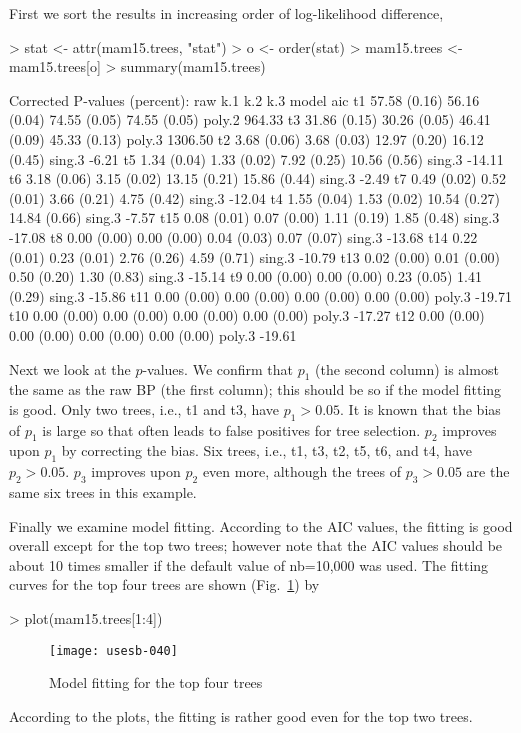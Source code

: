 \documentclass[a4paper]{amsart}
\begin{document}
First we sort the results in increasing order of log-likelihood difference,
\begin{Schunk}
\begin{Sinput}
> stat <- attr(mam15.trees, "stat")
> o <- order(stat)
> mam15.trees <- mam15.trees[o]
> summary(mam15.trees)
\end{Sinput}
\begin{Soutput}
Corrected P-values (percent):
    raw          k.1          k.2          k.3          model  aic     
t1  57.58 (0.16) 56.16 (0.04) 74.55 (0.05) 74.55 (0.05) poly.2  964.33 
t3  31.86 (0.15) 30.26 (0.05) 46.41 (0.09) 45.33 (0.13) poly.3 1306.50 
t2   3.68 (0.06)  3.68 (0.03) 12.97 (0.20) 16.12 (0.45) sing.3   -6.21 
t5   1.34 (0.04)  1.33 (0.02)  7.92 (0.25) 10.56 (0.56) sing.3  -14.11 
t6   3.18 (0.06)  3.15 (0.02) 13.15 (0.21) 15.86 (0.44) sing.3   -2.49 
t7   0.49 (0.02)  0.52 (0.01)  3.66 (0.21)  4.75 (0.42) sing.3  -12.04 
t4   1.55 (0.04)  1.53 (0.02) 10.54 (0.27) 14.84 (0.66) sing.3   -7.57 
t15  0.08 (0.01)  0.07 (0.00)  1.11 (0.19)  1.85 (0.48) sing.3  -17.08 
t8   0.00 (0.00)  0.00 (0.00)  0.04 (0.03)  0.07 (0.07) sing.3  -13.68 
t14  0.22 (0.01)  0.23 (0.01)  2.76 (0.26)  4.59 (0.71) sing.3  -10.79 
t13  0.02 (0.00)  0.01 (0.00)  0.50 (0.20)  1.30 (0.83) sing.3  -15.14 
t9   0.00 (0.00)  0.00 (0.00)  0.23 (0.05)  1.41 (0.29) sing.3  -15.86 
t11  0.00 (0.00)  0.00 (0.00)  0.00 (0.00)  0.00 (0.00) poly.3  -19.71 
t10  0.00 (0.00)  0.00 (0.00)  0.00 (0.00)  0.00 (0.00) poly.3  -17.27 
t12  0.00 (0.00)  0.00 (0.00)  0.00 (0.00)  0.00 (0.00) poly.3  -19.61 
\end{Soutput}
\end{Schunk}

Next we look at the $p$-values. We confirm that $p_1$ (the second
column) is almost the same as the raw BP (the first column); this
should be so if the model fitting is good. Only two trees, i.e., t1
and t3, have $p_1>0.05$. It is known that the bias of $p_1$ is large
so that often leads to false positives for tree selection. $p_2$
improves upon $p_1$ by correcting the bias. Six trees, i.e., t1, t3,
t2, t5, t6, and t4, have $p_2>0.05$. $p_3$ improves upon $p_2$ even
more, although the trees of $p_3>0.05$ are the same six trees in this
example.

Finally we examine model fitting.  According to the AIC values, the
fitting is good overall except for the top two trees; however note
that the AIC values should be about 10 times smaller if the default
value of nb=10,000 was used.  The fitting curves for the top four
trees are shown (Fig.~\ref{fig:mamplots}) by
\begin{Schunk}
\begin{Sinput}
> plot(mam15.trees[1:4])
\end{Sinput}
\end{Schunk}
\begin{figure}
\begin{center}
\texttt{[image: usesb-040]}
\caption{Model fitting for the top four trees}\label{fig:mamplots}
\end{center}
\end{figure}
According to the plots, the fitting is rather good even for the top two
trees. 
\end{document}
